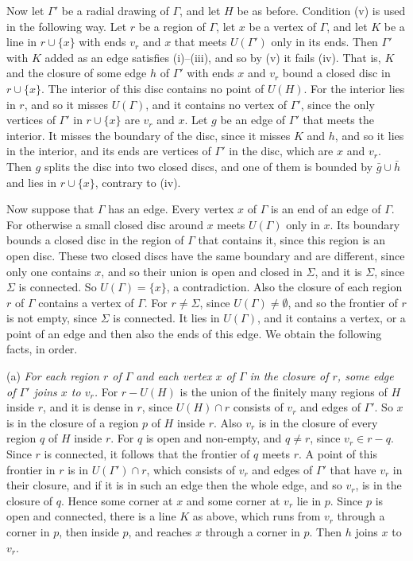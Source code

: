 {Now let $\Gamma'$ be a radial drawing of $\Gamma$, and let $H$ be as before. Condition (v) is used in the following way. Let $r$ be a region of $\Gamma$, let $x$ be a vertex of $\Gamma$, and let $K$ be a line in $r \cup \{x\}$ with ends $v_r$ and $x$ that meets $U(\Gamma')$ only in its ends. Then $\Gamma'$ with $K$ added as an edge satisfies (i)--(iii), and so by (v) it fails (iv). That is, $K$ and the closure of some edge $h$ of $\Gamma'$ with ends $x$ and $v_r$ bound a closed disc in $r \cup \{x\}$. The interior of this disc contains no point of $U(H)$. For the interior lies in $r$, and so it misses $U(\Gamma)$, and it contains no vertex of $\Gamma'$, since the only vertices of $\Gamma'$ in $r \cup \{x\}$ are $v_r$ and $x$. Let $g$ be an edge of $\Gamma'$ that meets the interior. It misses the boundary of the disc, since it misses $K$ and $h$, and so it lies in the interior, and its ends are vertices of $\Gamma'$ in the disc, which are $x$ and $v_r$. Then $g$ splits the disc into two closed discs, and one of them is bounded by $\bar{g} \cup \bar{h}$ and lies in $r \cup \{x\}$, contrary to (iv).

Now suppose that $\Gamma$ has an edge. Every vertex $x$ of $\Gamma$ is an end of an edge of $\Gamma$. For otherwise a small closed disc around $x$ meets $U(\Gamma)$ only in $x$. Its boundary bounds a closed disc in the region of $\Gamma$ that contains it, since this region is an open disc. These two closed discs have the same boundary and are different, since only one contains $x$, and so their union is open and closed in $\Sigma$, and it is $\Sigma$, since $\Sigma$ is connected. So $U(\Gamma) = \{x\}$, a contradiction. Also the closure of each region $r$ of $\Gamma$ contains a vertex of $\Gamma$. For $r \ne \Sigma$, since $U(\Gamma) \ne \emptyset$, and so the frontier of $r$ is not empty, since $\Sigma$ is connected. It lies in $U(\Gamma)$, and it contains a vertex, or a point of an edge and then also the ends of this edge. We obtain the following facts, in order.

\hspace*{12pt}(a) \textit{For each region $r$ of $\Gamma$ and each vertex $x$ of $\Gamma$ in the closure of $r$, some edge of $\Gamma'$ joins $x$ to $v_r$.} For $r - U(H)$ is the union of the finitely many regions of $H$ inside $r$, and it is dense in $r$, since $U(H) \cap r$ consists of $v_r$ and edges of $\Gamma'$. So $x$ is in the closure of a region $p$ of $H$ inside $r$. Also $v_r$ is in the closure of every region $q$ of $H$ inside $r$. For $q$ is open and non-empty, and $q \ne r$, since $v_r \in r - q$. Since $r$ is connected, it follows that the frontier of $q$ meets $r$. A point of this frontier in $r$ is in $U(\Gamma') \cap r$, which consists of $v_r$ and edges of $\Gamma'$ that have $v_r$ in their closure, and if it is in such an edge then the whole edge, and so $v_r$, is in the closure of $q$. Hence some corner at $x$ and some corner at $v_r$ lie in $p$. Since $p$ is open and connected, there is a line $K$ as above, which runs from $v_r$ through a corner in $p$, then inside $p$, and reaches $x$ through a corner in $p$. Then $h$ joins $x$ to $v_r$.

}
